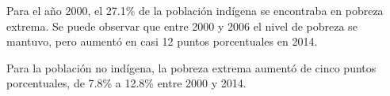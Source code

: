  Para el año 2000, el 27.1\%  de la población indígena se encontraba en pobreza extrema. Se puede observar que entre 2000 y 2006 el nivel de pobreza se mantuvo, pero aumentó en  casi  12 puntos porcentuales en 2014.
 
  Para la población no indígena, la pobreza extrema aumentó de cinco puntos porcentuales, de 7.8\% a 12.8\% entre 2000 y 2014.